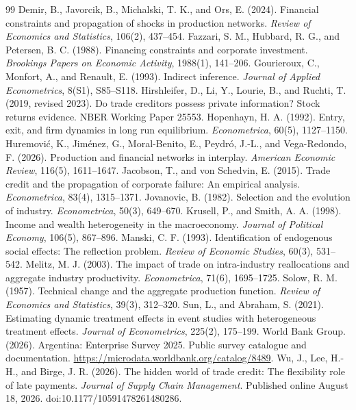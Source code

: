 \documentclass[11pt,a4paper]{article}
\begin{document}
\begin{thebibliography}{99}
 Demir, B., Javorcik, B., Michalski, T. K., and Ors, E. (2024). Financial constraints and propagation of shocks in production networks. \emph{Review of Economics and Statistics}, 106(2), 437--454.
 Fazzari, S. M., Hubbard, R. G., and Petersen, B. C. (1988). Financing constraints and corporate investment. \emph{Brookings Papers on Economic Activity}, 1988(1), 141--206.
 Gourieroux, C., Monfort, A., and Renault, E. (1993). Indirect inference. \emph{Journal of Applied Econometrics}, 8(S1), S85--S118.
 Hirshleifer, D., Li, Y., Lourie, B., and Ruchti, T. (2019, revised 2023). Do trade creditors possess private information? Stock returns evidence. NBER Working Paper 25553.
 Hopenhayn, H. A. (1992). Entry, exit, and firm dynamics in long run equilibrium. \emph{Econometrica}, 60(5), 1127--1150.
 Huremović, K., Jiménez, G., Moral-Benito, E., Peydró, J.-L., and Vega-Redondo, F. (2026). Production and financial networks in interplay. \emph{American Economic Review}, 116(5), 1611--1647.
 Jacobson, T., and von Schedvin, E. (2015). Trade credit and the propagation of corporate failure: An empirical analysis. \emph{Econometrica}, 83(4), 1315--1371.
 Jovanovic, B. (1982). Selection and the evolution of industry. \emph{Econometrica}, 50(3), 649--670.
 Krusell, P., and Smith, A. A. (1998). Income and wealth heterogeneity in the macroeconomy. \emph{Journal of Political Economy}, 106(5), 867--896.
 Manski, C. F. (1993). Identification of endogenous social effects: The reflection problem. \emph{Review of Economic Studies}, 60(3), 531--542.
 Melitz, M. J. (2003). The impact of trade on intra-industry reallocations and aggregate industry productivity. \emph{Econometrica}, 71(6), 1695--1725.
 Solow, R. M. (1957). Technical change and the aggregate production function. \emph{Review of Economics and Statistics}, 39(3), 312--320.
 Sun, L., and Abraham, S. (2021). Estimating dynamic treatment effects in event studies with heterogeneous treatment effects. \emph{Journal of Econometrics}, 225(2), 175--199.
 World Bank Group. (2026). Argentina: Enterprise Survey 2025. Public survey catalogue and documentation. \url{https://microdata.worldbank.org/catalog/8489}.
 Wu, J., Lee, H.-H., and Birge, J. R. (2026). The hidden world of trade credit: The flexibility role of late payments. \emph{Journal of Supply Chain Management}. Published online August 18, 2026. doi:10.1177/10591478261480286.
\end{thebibliography}
\end{document}
